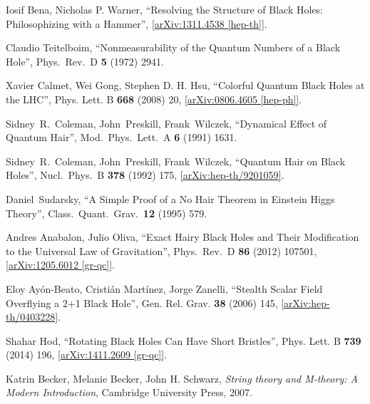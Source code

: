 \documentclass[12pt]{article}
\newcommand{\2}{$^2$}
\newcommand{\3}{$^3$}
\newcommand{\4}{$_4$}
\newcommand{\5}{$_5$}
\begin{document}
\begin{thebibliography}{400}
Iosif Bena, Nicholas P. Warner, ``Resolving the Structure of Black Holes: Philosophizing with a Hammer'', \href{http://arxiv.org/abs/1311.4538}{[arXiv:1311.4538 [hep-th]]}.

  Claudio Teitelboim,
  ``Nonmeasurability of the Quantum Numbers of a Black Hole'',
  Phys.\ Rev.\ D {\bf 5} (1972) 2941.

Xavier Calmet, Wei Gong, Stephen D. H. Hsu, ``Colorful Quantum Black Holes at the LHC'', Phys. Lett. B \textbf{668} (2008) 20, \href{http://arxiv.org/abs/0806.4605}{[arXiv:0806.4605 [hep-ph]]}.


  Sidney~R.~Coleman, John~Preskill, Frank~Wilczek,
  ``Dynamical Effect of Quantum Hair'',
  Mod.\ Phys.\ Lett.\ A {\bf 6} (1991) 1631.

  Sidney~R.~Coleman, John~Preskill, Frank~Wilczek,
  ``Quantum Hair on Black Holes'',
  Nucl.\ Phys.\ B {\bf 378} (1992) 175, \href{http://arxiv.org/abs/hep-th/9201059}{
  [arXiv:hep-th/9201059]}.

  Daniel~Sudarsky,
  ``A Simple Proof of a No Hair Theorem in Einstein Higgs Theory'',
  Class.\ Quant.\ Grav.\  {\bf 12} (1995) 579.

Andres Anabalon, Julio Oliva,
 ``Exact Hairy Black Holes and Their Modification to the Universal Law of Gravitation'',
  Phys.\ Rev.\ D {\bf 86} (2012) 107501,
  \href{http://arxiv.org/abs/1205.6012}{[arXiv:1205.6012 [gr-qc]]}.
	
Eloy Ay\'on-Beato, Cristi\'an Mart\'inez, Jorge Zanelli, ``Stealth Scalar Field Overflying a 2+1 Black Hole'', Gen. Rel. Grav. \textbf{38} (2006) 145, \href{http://arxiv.org/abs/hep-th/0403228}{[arXiv:hep-th/0403228]}.
	
Shahar Hod, ``Rotating Black Holes Can Have Short Bristles'', Phys. Lett. B \textbf{739} (2014) 196, \href{http://arxiv.org/abs/1411.2609}{[arXiv:1411.2609 [gr-qc]]}.

Katrin Becker, Melanie Becker, John H. Schwarz, \textit{String theory and M-theory: A Modern Introduction}, Cambridge University Press, 2007.


\end{thebibliography}
\end{document}
